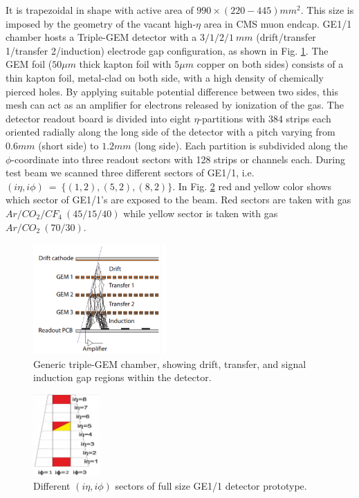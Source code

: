 It is trapezoidal in shape with active area of $990\times (220-445)mm^2$. This size is imposed by the geometry of the vacant high-$\eta$ area in CMS muon endcap. GE1/1 chamber hosts a Triple-GEM detector with a $3/1/2/1~mm$ (drift/transfer 1/transfer 2/induction) electrode gap configuration, as shown in Fig. \ref{GEM:cascade}. The GEM foil ($50\mu m$ thick kapton foil with $5\mu m$ copper on both sides) consists of a thin kapton foil, metal-clad on both side, with a high density of chemically pierced holes. By applying suitable potential difference between two sides, this mesh can act as an amplifier for electrons released by ionization of the gas. The detector readout board is divided into eight $\eta$-partitions with 384 strips each oriented radially along the long side of the detector with a pitch varying from $0.6mm$ (short side) to $1.2mm$ (long side). Each partition is subdivided along the $\phi$-coordinate into three readout sectors with 128 strips or channels each. During test beam we scanned three different sectors of GE1/1, i.e. $(i\eta,i\phi)~=~\{(1,2),(5,2),(8,2)\}$. In Fig. \ref{GE11} red and yellow color shows which sector of GE1/1's are exposed to the beam. Red sectors are taken with gas $Ar/CO_2/CF_4~(45/15/40) $ while yellow sector is taken with gas $Ar/CO_2~(70/30)$.

\begin{figure}[!htbp]
\centering
\includegraphics[width=2.0in]{figures/GEM/GEMCascade.png}
\caption{Generic triple-GEM chamber, showing drift, transfer, and signal induction gap regions within the detector.}
\label{GEM:cascade}
\end{figure}


\begin{figure}[!htbp]
\centering
\includegraphics[width=1.0in]{figures/GEM/GE11.png}
\caption{Different $(i\eta,i\phi)$ sectors of full size GE1/1 detector prototype.}
\label{GE11}
\end{figure}


